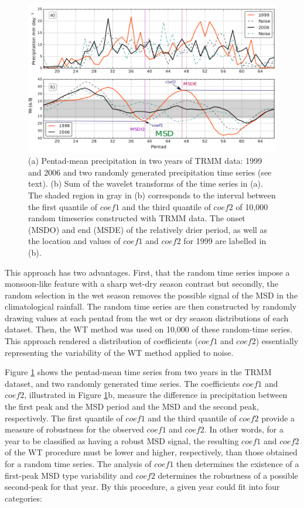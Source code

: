 \begin{figure}[t!]
\centering
\includegraphics[width=\linewidth]{figures/wav_S1.pdf}
\caption[Determination of MSD timings and coefficients]{(a) Pentad-mean precipitation in two years of TRMM data: 1999 and 2006 and two randomly generated precipitation time series (see text). (b) Sum of the wavelet transforms of the time series in (a). The shaded region in gray in (b) corresponds to the interval between the first quantile of $coef1$ and the third quantile of $coef2$ of 10,000 random timeseries constructed with TRMM data. The onset (MSDO) and end (MSDE) of the relatively drier period, as well as the location and values of $coef1$ and $coef2$ for 1999 are labelled in (b). }
\label{fig:S1}
\end{figure}
 
 
 This approach has two advantages. First, that the random time series impose a monsoon-like feature with a sharp wet-dry season contrast but secondly, the random selection in the wet season removes the possible signal of the MSD in the climatological rainfall.
 The random time series are then constructed by randomly drawing values at each pentad  from the wet or dry season distributions of each dataset.
 Then, the WT method was used on 10,000 of these random-time series. This approach rendered a distribution of coefficients ($coef1$ and $coef2$) essentially representing the variability of the WT method applied to noise.
 
  Figure \ref{fig:S1} shows the pentad-mean time series from two years in the TRMM dataset, and two randomly generated time series.
The coefficients $coef1$ and $coef2$, illustrated in Figure \ref{fig:S1}b, measure the difference in precipitation between the first peak and the MSD period and the MSD and the second peak, respectively. The first quantile of $coef1$ and the third quantile of $coef2$ provide a measure of robustness for the observed $coef1$ and $coef2$. In other words, for a year to be classified as having a robust MSD signal, the resulting $coef1$ and $coef2$ of the WT procedure must be lower and higher, respectively, than those obtained for a random time series.
The analysis of $coef1$ then determines the existence of a first-peak MSD type variability and $coef2$ determines the robustness of a possible second-peak for that year.
By this procedure, a given year could fit into four categories:

